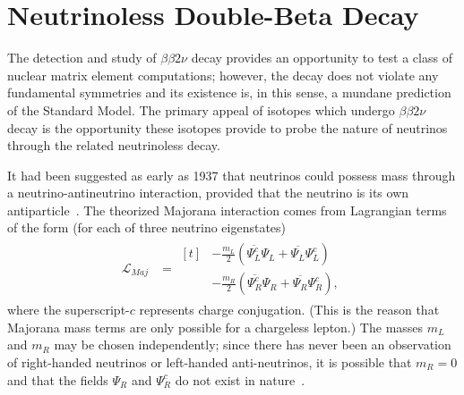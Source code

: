 \section{Neutrinoless Double-Beta Decay}\label{sec:TheoryNeutrinolessDoubleBeta}

The detection and study of $\beta\beta 2\nu$ decay provides an opportunity to test a class of nuclear matrix element computations; however, the decay does not violate any fundamental symmetries and its existence is, in this sense, a mundane prediction of the Standard Model.  The primary appeal of isotopes which undergo $\beta\beta 2\nu$ decay is the opportunity these isotopes provide to probe the nature of neutrinos through the related neutrinoless decay.

It had been suggested as early as 1937 that neutrinos could possess mass through a neutrino-antineutrino interaction, provided that the neutrino is its own antiparticle~\cite{Majorana}.  The theorized Majorana interaction comes from Lagrangian terms of the form (for each of three neutrino eigenstates)
\begin{align}
\mathcal{L}_{Maj}&= \begin{aligned}[t]
 & -\frac{m_{L}}{2} \left( \overline{\Psi_L^c} \Psi_L^{} + \overline{\Psi_L^{}} \Psi_L^c \right)\\
 & -\frac{m_{R}}{2} \left( \overline{\Psi_R^c} \Psi_R^{} + \overline{\Psi_R^{}} \Psi_R^c \right),
\end{aligned}\label{eqn:MajoranaLagrangianTerms}
\end{align}
where the superscript-$c$ represents charge conjugation.  (This is the reason that Majorana mass terms are only possible for a chargeless lepton.)  The masses $m_L$ and $m_R$ may be chosen independently; since there has never been an observation of right-handed neutrinos or left-handed anti-neutrinos, it is possible that $m_R = 0$ and that the fields $\Psi_R^{}$ and $\Psi_R^c$ do not exist in nature~\cite{RMPbb0n}.

